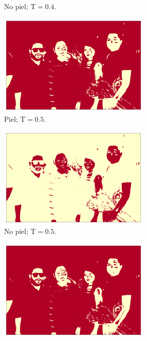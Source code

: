 \begin{figure}[ht!]
\begin{subfigure}{0.4\textwidth}
        \caption{No piel; $\text{T} = 0.4$.}
    \end{subfigure}
    \begin{subfigure}{0.4\textwidth}
        \centering
        \includegraphics[width=0.8\textwidth]{../figures/image6/image_06_treshskin_50percent.png}
        \caption{Piel; $\text{T} = 0.5$.}
    \end{subfigure}
    \hspace{1cm}
    \begin{subfigure}{0.4\textwidth}
        \centering
        \includegraphics[width=0.8\textwidth]{../figures/image6/image_06_treshbg_50percent.png}
        \caption{No piel; $\text{T} = 0.5$.}
    \end{subfigure}
    \begin{subfigure}{0.4\textwidth}
        \centering
        \includegraphics[width=0.8\textwidth]{../figures/image6/image_06_treshskin_60percent.png}

\end{subfigure}
\end{figure}
